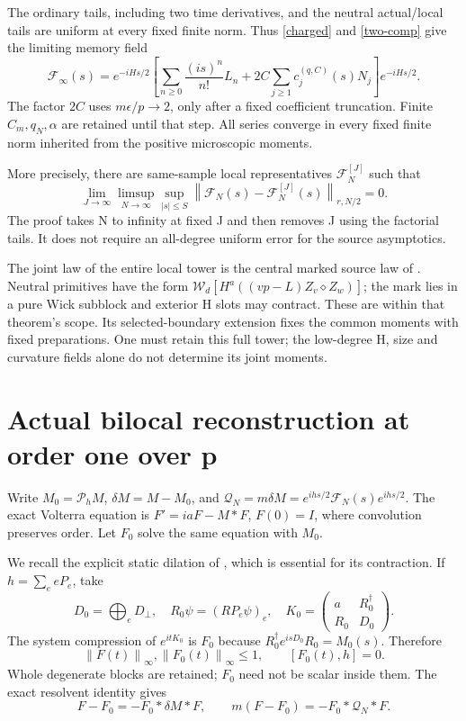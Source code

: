 \documentclass[11pt]{article}
\newcommand{\Pin}{\mathcal P_h}
\newcommand{\norm}[1]{\left\lVert#1\right\rVert}
\begin{document}
The ordinary tails, including two time derivatives, and the
neutral actual/local tails are uniform at every fixed finite
norm. Thus \eqref{charged} and \eqref{two-comp} give the limiting
memory field
\begin{equation}\label{memory-limit}
 \mathcal F_\infty(s)=e^{-iHs/2}
 \left[\sum_{n\ge0}\frac{(is)^n}{n!}L_n
               +2C\sum_{j\ge1}c_j^{(q,C)}(s)N_j\right]e^{-iHs/2}.
\end{equation}
The factor $2C$ uses $m\epsilon/p\to2$, only after a fixed
coefficient truncation. Finite $C_m,q_N,\alpha$ are retained
until that step. All series converge in every fixed finite
norm inherited from the positive microscopic moments.

More precisely, there are same-sample local representatives
$\mathcal F_N^{[J]}$ such that
\begin{equation}\label{local-error}
 \lim_{J\to\infty}\limsup_{N\to\infty}\sup_{|s|\le S}
       \norm{\mathcal F_N(s)-\mathcal F_N^{[J]}(s)}_{r,N/2}=0.
\end{equation}
The proof takes N to infinity at fixed J and then removes J
using the factorial tails. It does not require an all-degree
uniform error for the source asymptotics.

The joint law of the entire local tower is the central marked
source law of \cite{higher,central}. Neutral primitives have
the form $\mathcal W_d[H^a((vp-L)Z_v\diamond Z_w)]$; the mark
lies in a pure Wick subblock and exterior H slots may contract.
These are within that theorem's scope. Its selected-boundary
extension fixes the common moments with fixed preparations.
One must retain this full tower; the low-degree H, size and
curvature fields alone do not determine its joint moments.

\newpage
\section{Actual bilocal reconstruction at order one over p}
Write $M_0=\Pin M$, $\delta M=M-M_0$, and
$\mathcal Q_N=m\delta M=e^{ihs/2}\mathcal F_N(s)e^{ihs/2}$.
The exact Volterra equation is
$F'=iaF-M*F$, $F(0)=I$, where convolution preserves order.
Let $F_0$ solve the same equation with $M_0$.

We recall the explicit static dilation of \cite{reconstruct},
which is essential for its contraction. If $h=\sum_e eP_e$, take
\[
 D_0=\bigoplus_eD_\perp,\quad R_0\psi=(RP_e\psi)_e,\quad
 K_0=\begin{pmatrix}a&R_0^\dagger\\R_0&D_0\end{pmatrix}.
\]
The system compression of $e^{itK_0}$ is $F_0$ because
$R_0^\dagger e^{isD_0}R_0=M_0(s)$. Therefore
\[
 \norm{F(t)}_\infty,\norm{F_0(t)}_\infty\le1,\qquad [F_0(t),h]=0.
\]
Whole degenerate blocks are retained; $F_0$ need not be scalar
inside them. The exact resolvent identity gives
\begin{equation}\label{volterra}
 F-F_0=-F_0*\delta M*F,\qquad
 m(F-F_0)=-F_0*\mathcal Q_N*F.
\end{equation}
\end{document}
